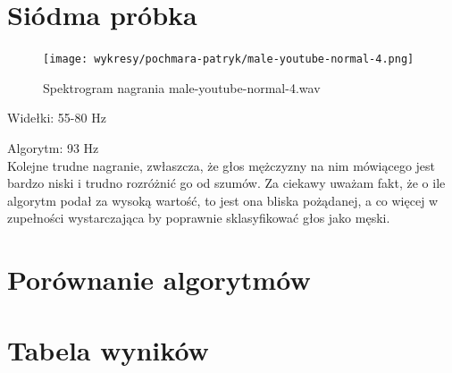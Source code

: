 \documentclass[a4paper,12pt]{extarticle}
\begin{document}
\newpage

\section*{Siódma próbka}

\begin{figure}[h!]
\centering
\texttt{[image: wykresy/pochmara-patryk/male-youtube-normal-4.png]}
\caption{Spektrogram nagrania male-youtube-normal-4.wav}
\end{figure}

\noindent Widełki: 55-80 Hz

\noindent Algorytm: 93 Hz\\

\noindent Kolejne trudne nagranie, zwłaszcza, że głos mężczyzny na nim mówiącego jest bardzo niski i trudno rozróżnić go od szumów. Za ciekawy uważam fakt, że o ile algorytm podał za wysoką wartość, to jest ona bliska pożądanej, a co więcej w zupełności wystarczająca by poprawnie sklasyfikować głos jako męski.

\clearpage

\section{Porównanie algorytmów}
\label{sec:compare}

\section*{Tabela wyników}
\end{document}

